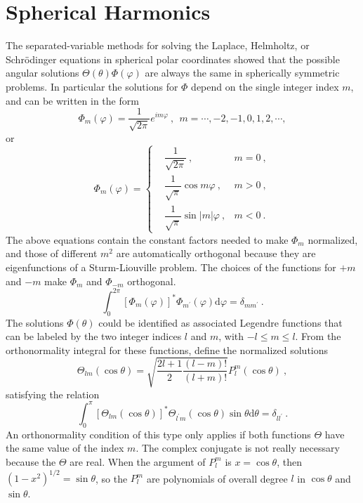 \documentclass[12pt,a4paper]{article}
\newcommand{\dif}{\mathrm{d}}
\begin{document}
\section{Spherical Harmonics}
\cite{arfken} The separated-variable methods for solving the Laplace, Helmholtz, or Schr\"odinger equations in spherical polar coordinates showed that the possible angular solutions $\Theta(\theta)\Phi(\varphi)$ are always the same in spherically symmetric problems. In particular the solutions for $\Phi$ depend on the single integer index $m$, and can be written in the form
\begin{equation}
\Phi_m(\varphi) = \dfrac{1}{\sqrt{2\pi}} e^{i m\varphi} ~, ~~ m = \cdots, -2, -1, 0, 1, 2, \cdots ,
\end{equation}
or 
\begin{equation}
\Phi_m(\varphi) = \left\{
\begin{aligned}
& \dfrac{1}{\sqrt{2\pi}} ~, & m = 0 ~, \\
& \dfrac{1}{\sqrt{\pi}} \cos m \varphi ~, & m > 0 ~, \\
& \dfrac{1}{\sqrt{\pi}} \sin |m| \varphi ~, & m < 0 ~.
\end{aligned}
\right.
\end{equation}
The above equations contain the constant factors needed to make $\Phi_m$ normalized, and those of different $m^2$ are automatically orthogonal because they are eigenfunctions of a Sturm-Liouville problem. The choices of the functions for $+m$ and $-m$ make $\Phi_m$ and $\Phi_{-m}$ orthogonal.
\begin{equation}
\int_0^{2\pi} [\Phi_m(\varphi) ]^\ast \Phi_{m^\prime}(\varphi) \dif \varphi = \delta_{mm^\prime} ~.
\end{equation}
The solutions $\Phi(\theta)$ could be identified as associated Legendre functions that can be labeled by the two integer indices $l$ and $m$, with $-l \leqslant m \leqslant l$. From the orthonormality integral for these functions, define the normalized solutions
\begin{equation}
\Theta_{lm} (\cos \theta) = \sqrt{\dfrac{2l+1}{2} \dfrac{(l-m)!}{(l+m)!} } P_l^m(\cos \theta) ~,
\end{equation}
satisfying the relation
\begin{equation}
\int_0^\pi [\Theta_{lm} (\cos \theta)]^\ast \Theta_{l^\prime m} (\cos \theta) \sin \theta \dif \theta = \delta_{ll^\prime} ~.
\end{equation}
An orthonormality condition of this type only applies if both functions $\Theta$ have the same value of the index $m$.  The complex conjugate is not really necessary because the $\Theta$ are real. When the argument of $P_l^m$ is $x = \cos \theta$, then $(1 -x^2)^{1/2} = \sin \theta$, so the $P_l^m$ are polynomials of overall degree $l$ in $\cos \theta$ and $\sin \theta$.
\end{document}
